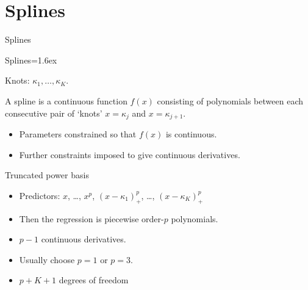 \documentclass[14pt]{beamer}
\makeatletter
\def\biz{\begin{itemize}[<+-| alert@+>]}
\def\eiz{\end{itemize}}
\makeatother
\begin{document}
\section{Splines}




\begin{frame}{Splines}
\end{frame}
 
\begin{frame}{Splines}\parskip=1.6ex

Knots: $\kappa_1,\dots,\kappa_K$.

\pause

A spline is a continuous function $f(x)$ consisting of polynomials between each
consecutive pair of `knots' $x=\kappa_j$ and $x=\kappa_{j+1}$.

\pause

\begin{itemize}
\item Parameters constrained so that $f(x)$ is continuous.

\item Further constraints imposed to give continuous derivatives.
\end{itemize}
\end{frame}


\begin{frame}

\end{frame}

\begin{frame}{Truncated power basis}
\biz

\item Predictors: $x$, \dots, $x^p$, $(x-\kappa_{1})_+^p$, \dots, $(x-\kappa_{K})_+^p$

\item Then the regression is piecewise order-$p$ polynomials.
\item $p-1$ continuous derivatives.
\item Usually choose $p=1$ or $p=3$.

\item $p+K+1$ degrees of freedom
\eiz
\end{frame}
\end{document}
